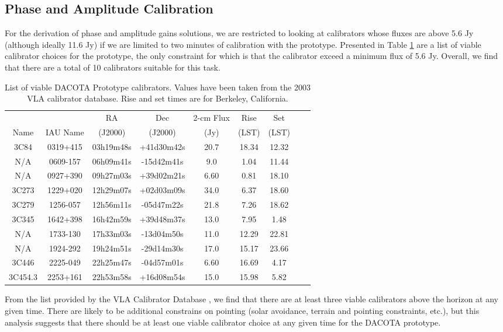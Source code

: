 \documentclass[preprint]{aastex}
\begin{document}
\subsection{Phase and Amplitude Calibration}\label{ssecphamp}
For the derivation of phase and amplitude gains solutions, we are restricted to looking at calibrators whose fluxes are above 5.6 Jy (although ideally 11.6 Jy) if we are limited to two minutes of calibration with the prototype. Presented in Table \ref{tablecal} are a list of viable calibrator choices for the prototype, the only constraint for which is that the calibrator exceed a minimum flux of 5.6 Jy. Overall, we find that there are a total of 10 calibrators suitable for this task.
\begin{table}[!h]
\begin{center}
\begin{tabular}{|c|c||c|c|c|c|c|c|c} \hline
 & & RA & Dec & 2-cm Flux& Rise & Set \\
Name & IAU Name & (J2000) & (J2000) & (Jy) & (LST) & (LST) \\
\hline
\hline
3C84 & 0319+415 & 03h19m48s & +41d30m42s & 20.7 & 18.34 & 12.32 \\
N/A & 0609-157 & 06h09m41s & -15d42m41s & 9.0 & 1.04 & 11.44 \\
N/A & 0927+390 & 09h27m03s & +39d02m21s & 6.60 & 0.81 & 18.10 \\
3C273 & 1229+020 & 12h29m07s & +02d03m09s & 34.0 & 6.37 & 18.60 \\
3C279 & 1256-057 & 12h56m11s & -05d47m22s & 21.8 & 7.26 & 18.62 \\
3C345 & 1642+398 & 16h42m59s & +39d48m37s & 13.0 & 7.95 & 1.48 \\
N/A & 1733-130 & 17h33m03s & -13d04m50s & 11.0 & 12.29 & 22.81 \\
N/A & 1924-292 & 19h24m51s & -29d14m30s & 17.0 & 15.17 & 23.66 \\
3C446 & 2225-049 & 22h25m47s & -04d57m01s & 6.60 & 16.69 & 4.17 \\
3C454.3 & 2253+161 & 22h53m58s & +16d08m54s & 15.0 & 15.98 & 5.82 \\
\hline
\end{tabular}
\caption{List of viable DACOTA Prototype calibrators. Values have been taken from the 2003 VLA calibrator database. Rise and set times are for Berkeley, California.
\label{tablecal}} 
\end{center}
\end{table}
From the list provided by the VLA Calibrator Database \citep{VLACalCat}, we find that there are at least three viable calibrators above the horizon at any given time. There are likely to be additional constrains on pointing (solar avoidance, terrain and pointing constraints, etc.), but this analysis suggests that there should be at least one viable calibrator choice at any given time for the DACOTA prototype.
\end{document}
